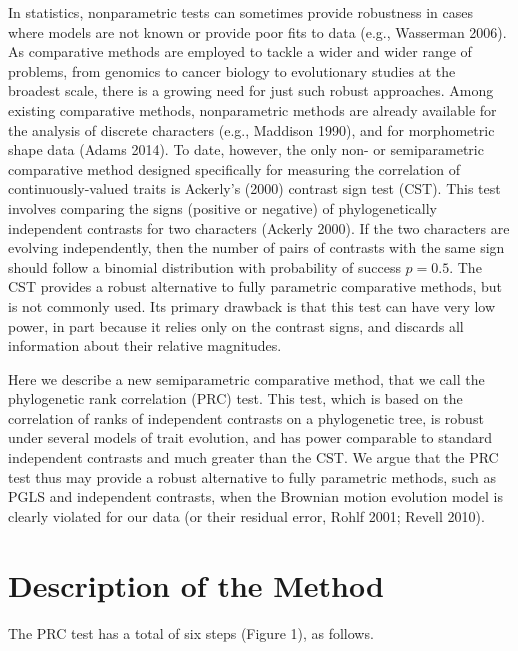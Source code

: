 \documentclass[fleqn,10pt,lineno]{wlpeerj} %
\begin{document}
In statistics, nonparametric tests can sometimes provide robustness in cases where models are not known or provide poor fits to data (e.g., Wasserman 2006). As comparative methods are employed to tackle a wider and wider range of problems, from genomics to cancer biology to evolutionary studies at the broadest scale, there is a growing need for just such robust approaches. Among existing comparative methods, nonparametric methods are already available for the analysis of discrete characters (e.g., Maddison 1990), and for morphometric shape data (Adams 2014). To date, however, the only non- or semiparametric comparative method designed specifically for measuring the correlation of continuously-valued traits is Ackerly's (2000) contrast sign test (CST). This test involves comparing the signs (positive or negative) of phylogenetically independent contrasts for two characters (Ackerly 2000). If the two characters are evolving independently, then the number of pairs of contrasts with the same sign should follow a binomial distribution with probability of success \(p=0.5\). The CST provides a robust alternative to fully parametric comparative methods, but is not commonly used. Its primary drawback is that this test can have very low power, in part because it relies only on the contrast signs, and discards all information about their relative magnitudes.

Here we describe a new semiparametric comparative method, that we call the phylogenetic rank correlation (PRC) test. This test, which is based on the correlation of ranks of independent contrasts on a phylogenetic tree, is robust under several models of trait evolution, and has power comparable to standard independent contrasts and much greater than the CST. We argue that the PRC test thus may provide a robust alternative to fully parametric methods, such as PGLS and independent contrasts, when the Brownian motion evolution model is clearly violated for our data (or their residual error, Rohlf 2001; Revell 2010).

\section{Description of the Method}\label{description-of-the-method}

The PRC test has a total of six steps (Figure 1), as follows.
\end{document}
